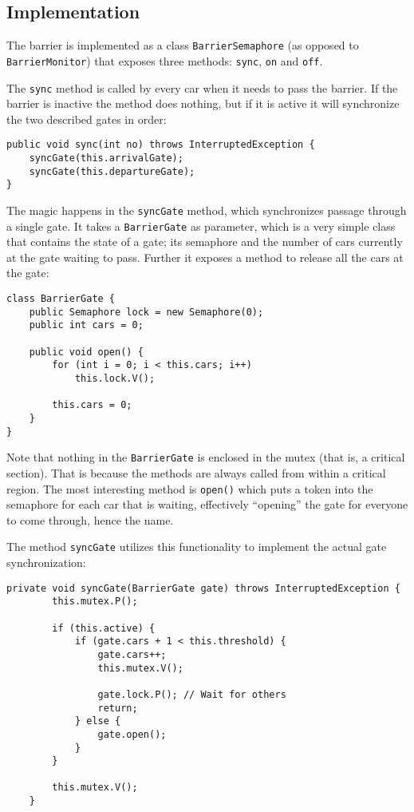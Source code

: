 \subsection{Implementation}
The barrier is implemented as a class \texttt{BarrierSemaphore} (as opposed to \texttt{BarrierMonitor}) that exposes three methods: \texttt{sync}, \texttt{on} and \texttt{off}.

The \texttt{sync} method is called by every car when it needs to pass the barrier. If the barrier is inactive the method does nothing, but if it is active it will synchronize the two described gates in order:

\begin{lstlisting}
public void sync(int no) throws InterruptedException {
    syncGate(this.arrivalGate);
    syncGate(this.departureGate);
}
\end{lstlisting}


The magic happens in the \texttt{syncGate} method, which synchronizes passage through a single gate. It takes a \texttt{BarrierGate} as parameter, which is a very simple class that contains the state of a gate; its semaphore and the number of cars currently at the gate waiting to pass. Further it exposes a method to release all the cars at the gate:

\begin{lstlisting}
class BarrierGate {
    public Semaphore lock = new Semaphore(0);
    public int cars = 0;

    public void open() {
        for (int i = 0; i < this.cars; i++)
            this.lock.V();

        this.cars = 0;
    }
}
\end{lstlisting}

Note that nothing in the \texttt{BarrierGate} is enclosed in the mutex (that is, a critical section). That is because the methods are always called from within a critical region. The most interesting method is \texttt{open()} which puts a token into the semaphore for each car that is waiting, effectively ``opening'' the gate for everyone to come through, hence the name.

The method \texttt{syncGate} utilizes this functionality to implement the actual gate synchronization:

\begin{lstlisting}
private void syncGate(BarrierGate gate) throws InterruptedException {
        this.mutex.P();

        if (this.active) {
            if (gate.cars + 1 < this.threshold) {
                gate.cars++;
                this.mutex.V();

                gate.lock.P(); // Wait for others
                return;
            } else {
                gate.open();
            }
        }

        this.mutex.V();
    }
\end{lstlisting}

